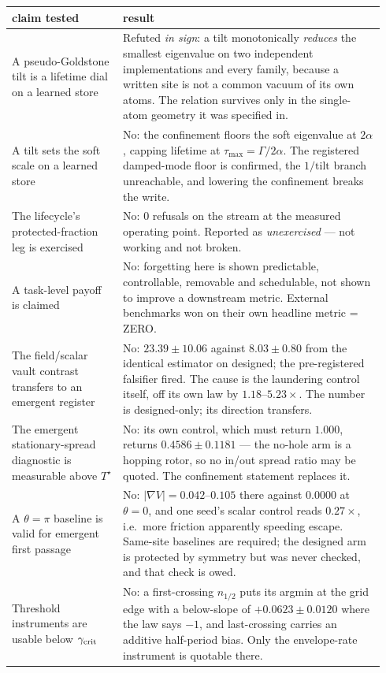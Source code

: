 \documentclass{article}
\begin{document}
{\begin{center}
\end{center}
\begin{center}
\begin{tabular}{p{0.28\linewidth}p{0.66\linewidth}}
\toprule
claim tested & result\\
\midrule
A pseudo-Goldstone tilt is a lifetime dial on a learned store & Refuted \emph{in sign}: a tilt monotonically \emph{reduces} the smallest eigenvalue on two independent implementations and every family, because a written site is not a common vacuum of its own atoms. The relation survives only in the single-atom geometry it was specified in.\\
A tilt sets the soft scale on a learned store & No: the confinement floors the soft eigenvalue at $2\alpha$, capping lifetime at $\tau_{\max}=\Gamma/2\alpha$. The registered damped-mode floor is confirmed, the $1/\text{tilt}$ branch unreachable, and lowering the confinement breaks the write.\\
The lifecycle's protected-fraction leg is exercised & No: 0 refusals on the stream at the measured operating point. Reported as \emph{unexercised} --- not working and not broken.\\
A task-level payoff is claimed & No: forgetting here is shown predictable, controllable, removable and schedulable, not shown to improve a downstream metric. External benchmarks won on their own headline metric = ZERO.\\
The field/scalar vault contrast transfers to an emergent register & No: $23.39\pm10.06$ against $8.03\pm0.80$ from the identical estimator on designed; the pre-registered falsifier fired. The cause is the laundering control itself, off its own law by $1.18$--$5.23\times$. The number is designed-only; its direction transfers.\\
The emergent stationary-spread diagnostic is measurable above $T^\star$ & No: its own control, which must return $1.000$, returns $0.4586\pm0.1181$ --- the no-hole arm is a hopping rotor, so no in/out spread ratio may be quoted. The confinement statement replaces it.\\
A $\theta=\pi$ baseline is valid for emergent first passage & No: $|\nabla V|=0.042$--$0.105$ there against $0.0000$ at $\theta=0$, and one seed's scalar control reads $0.27\times$, i.e.\ more friction apparently speeding escape. Same-site baselines are required; the designed arm is protected by symmetry but was never checked, and that check is owed.\\
Threshold instruments are usable below $\gamma_{\rm crit}$ & No: a first-crossing $n_{1/2}$ puts its argmin at the grid edge with a below-slope of $+0.0623\pm0.0120$ where the law says $-1$, and last-crossing carries an additive half-period bias. Only the envelope-rate instrument is quotable there.\\

\end{tabular}
\end{center}}
\end{document}
